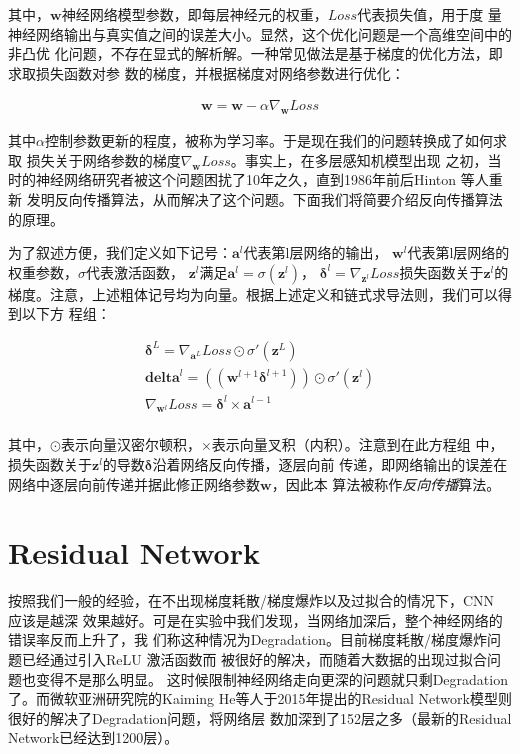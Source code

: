其中，$\mathbf{w}$神经网络模型参数，即每层神经元的权重，$Loss$代表损失值，用于度
量神经网络输出与真实值之间的误差大小。显然，这个优化问题是一个高维空间中的非凸优
化问题，不存在显式的解析解。一种常见做法是基于梯度的优化方法，即求取损失函数对参
数的梯度，并根据梯度对网络参数进行优化：

\begin{align}
\mathbf{w} = \mathbf{w} - \alpha\nabla_{\mathbf{w}}{Loss}
\end{align}

其中$\alpha$控制参数更新的程度，被称为学习率。于是现在我们的问题转换成了如何求取
损失关于网络参数的梯度$\nabla_{\mathbf{w}}{Loss}$。事实上，在多层感知机模型出现
之初，当时的神经网络研究者被这个问题困扰了10年之久，直到1986年前后Hinton 等人重新
发明反向传播算法，从而解决了这个问题。下面我们将简要介绍反向传播算法的原理。

为了叙述方便，我们定义如下记号：$\mathbf{a}^{l}$代表第l层网络的输出，
$\mathbf{w}^{l}$代表第l层网络的权重参数，$\sigma$代表激活函数，
$\mathbf{z}^{l}$满足$\mathbf{a}^{l} = \sigma(\mathbf{z}^{l})$，
$\mathbf{\delta}^{l} = \nabla_{\mathbf{z}^l}{Loss}$损失函数关于$\mathbf{z}^l$的
梯度。注意，上述粗体记号均为向量。根据上述定义和链式求导法则，我们可以得到以下方
程组：

\begin{align}
  \mathbf{\delta}^L = \nabla_{\mathbf{a}^L}{Loss} \odot \sigma'(\mathbf{z}^L) \\
  \mathbf{delta}^l = ((\mathbf{w}^{l+1}\mathbf{\delta}^{l+1})) \odot \sigma'(\mathbf{z}^l) \\
  \nabla_{\mathbf{w}^l}{Loss} = \mathbf{\delta}^l \times \mathbf{a}^{l-1} \\
\end{align}

其中，$\odot$表示向量汉密尔顿积，$\times$表示向量叉积（内积）。注意到在此方程组
中，损失函数关于$\mathbf{z}^l$的导数$\mathbf{\delta}$沿着网络反向传播，逐层向前
传递，即网络输出的误差在网络中逐层向前传递并据此修正网络参数$\mathbf{w}$，因此本
算法被称作\textit{反向传播}算法。

\section{Residual Network}

按照我们一般的经验，在不出现梯度耗散/梯度爆炸以及过拟合的情况下，CNN 应该是越深
效果越好。可是在实验中我们发现，当网络加深后，整个神经网络的错误率反而上升了，我
们称这种情况为Degradation。目前梯度耗散/梯度爆炸问题已经通过引入ReLU 激活函数而
被很好的解决\cite{Nair:2010vq}，而随着大数据的出现过拟合问题也变得不是那么明显。
这时候限制神经网络走向更深的问题就只剩Degradation了。而微软亚洲研究院的Kaiming
He等人于2015年提出的Residual Network模型则很好的解决了Degradation问题，将网络层
数加深到了152层之多（最新的Residual Network已经达到1200层）。

